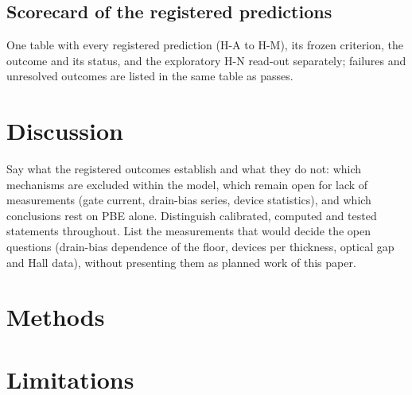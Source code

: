 \documentclass[11pt]{article}
\begin{document}
\subsection{Scorecard of the registered predictions}
\label{sec:r-scorecard}
\begin{pdIntent}
One table with every registered prediction (H-A to H-M), its frozen criterion, the outcome and its status, and the
exploratory H-N read-out separately; failures and unresolved outcomes are listed in the same table as passes. %
\end{pdIntent}

\section{Discussion}
\label{sec:discussion}
\begin{pdIntent}
Say what the registered outcomes establish and what they do not: which mechanisms are excluded within the model, which
remain open for lack of measurements (gate current, drain-bias series, device statistics), and which conclusions rest
on PBE alone. Distinguish calibrated, computed and tested statements throughout. List the measurements that would
decide the open questions (drain-bias dependence of the floor, devices per thickness, optical gap and Hall data),
without presenting them as planned work of this paper. %
\end{pdIntent}

\section{Methods}
\label{sec:methods}




\section{Limitations}


\end{document}
